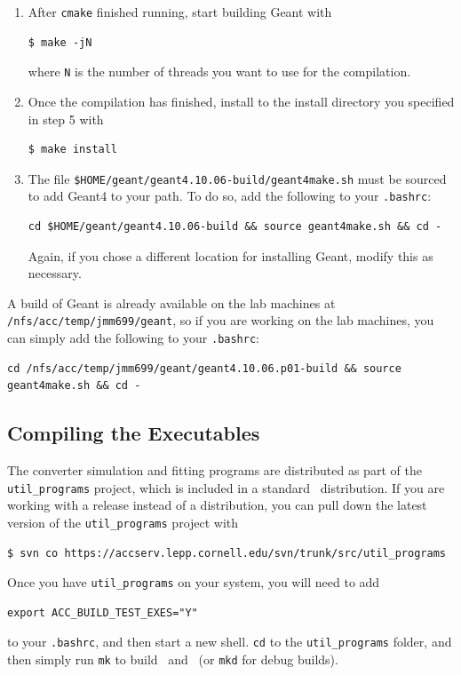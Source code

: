 \documentclass[12pt]{article}
\begin{document}
\begin{enumerate}
\item
After \texttt{cmake} finished running, start building Geant with
\begin{verbatim}
$ make -jN
\end{verbatim}
where \texttt{N} is the number of threads you want to use for the compilation.

\item
Once the compilation has finished, install to the install directory you specified in step 5 with
\begin{verbatim}
$ make install
\end{verbatim}

\item
The file \texttt{\$HOME/geant/geant4.10.06-build/geant4make.sh} must be sourced to add Geant4 to your path.
To do so, add the following to your \texttt{.bashrc}:
\begin{verbatim}
cd $HOME/geant/geant4.10.06-build && source geant4make.sh && cd -
\end{verbatim}
Again, if you chose a different location for installing Geant, modify this as necessary.

\end{enumerate}

A build of Geant is already available on the lab machines at \texttt{/nfs/acc/temp/jmm699/geant}, so if you are working on the lab machines, you can simply add the following to your \texttt{.bashrc}:
\begin{verbatim}
cd /nfs/acc/temp/jmm699/geant/geant4.10.06.p01-build && source geant4make.sh && cd -
\end{verbatim}


\subsection{Compiling the Executables}
The converter simulation and fitting programs are distributed as part of the \texttt{util\_programs} project, which is included in a standard \bmad \, distribution.
If you are working with a release instead of a distribution, you can pull down the latest version of the \texttt{util\_programs} project with
\begin{verbatim}
$ svn co https://accserv.lepp.cornell.edu/svn/trunk/src/util_programs
\end{verbatim}
Once you have \texttt{util\_programs} on your system, you will need to add
\begin{verbatim}
export ACC_BUILD_TEST_EXES="Y"
\end{verbatim}
to your \texttt{.bashrc}, and then start a new shell.
\texttt{cd} to the \texttt{util\_programs} folder, and then simply run \texttt{mk} to build \exes \, and \exef \, (or \texttt{mkd} for debug builds).
\end{document}
